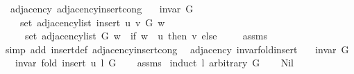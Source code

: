 \begin{isabellebody}
%
\isadelimproof
\isanewline
%
\endisadelimproof
\isanewline
{}\isamarkupfalse%
\ {\isacharparenleft}{\kern0pt}\ adjacency{\isacharparenright}{\kern0pt}\ adjacency{\isacharunderscore}{\kern0pt}insert{\isacharprime}{\kern0pt}{\isacharunderscore}{\kern0pt}cong{\isacharcolon}{\kern0pt}\isanewline
\ \ \ {\isachardoublequoteopen}invar\ G{\isachardoublequoteclose}\isanewline
\ \ \isanewline
\ \ \ \ {\isachardoublequoteopen}set\ {\isacharparenleft}{\kern0pt}adjacency{\isacharunderscore}{\kern0pt}list\ {\isacharparenleft}{\kern0pt}insert{\isacharprime}{\kern0pt}\ u\ v\ G{\isacharparenright}{\kern0pt}\ w{\isacharparenright}{\kern0pt}\ {\isacharequal}{\kern0pt}\isanewline
\ \ \ \ \ set\ {\isacharparenleft}{\kern0pt}adjacency{\isacharunderscore}{\kern0pt}list\ G\ w{\isacharparenright}{\kern0pt}\ {\isasymunion}\ {\isacharparenleft}{\kern0pt}if\ w\ {\isacharequal}{\kern0pt}\ u\ then\ {\isacharbraceleft}{\kern0pt}v{\isacharbraceright}{\kern0pt}\ else\ {\isacharbraceleft}{\kern0pt}{\isacharbraceright}{\kern0pt}{\isacharparenright}{\kern0pt}{\isachardoublequoteclose}\isanewline
%
\isadelimproof
\ \ %
\endisadelimproof
%
\isatagproof
{}\isamarkupfalse%
\ assms\isanewline
\ \ \isamarkupfalse%
\ {\isacharparenleft}{\kern0pt}simp\ add{\isacharcolon}{\kern0pt}\ insert{\isacharprime}{\kern0pt}{\isacharunderscore}{\kern0pt}def\ adjacency{\isacharunderscore}{\kern0pt}insert{\isacharunderscore}{\kern0pt}cong{\isacharparenright}{\kern0pt}%
\endisatagproof
{\isafoldproof}%
%
\isadelimproof
\isanewline
%
\endisadelimproof
\isanewline
{}\isamarkupfalse%
\ {\isacharparenleft}{\kern0pt}\ adjacency{\isacharparenright}{\kern0pt}\ invar{\isacharunderscore}{\kern0pt}fold{\isacharunderscore}{\kern0pt}insert{\isacharprime}{\kern0pt}{\isacharcolon}{\kern0pt}\isanewline
\ \ \ {\isachardoublequoteopen}invar\ G{\isachardoublequoteclose}\isanewline
\ \ \ {\isachardoublequoteopen}invar\ {\isacharparenleft}{\kern0pt}fold\ {\isacharparenleft}{\kern0pt}insert{\isacharprime}{\kern0pt}\ u{\isacharparenright}{\kern0pt}\ l\ G{\isacharparenright}{\kern0pt}{\isachardoublequoteclose}\isanewline
%
\isadelimproof
\ \ %
\endisadelimproof
%
\isatagproof
{}\isamarkupfalse%
\ assms\isanewline
{}\isamarkupfalse%
\ {\isacharparenleft}{\kern0pt}induct\ l\ arbitrary{\isacharcolon}{\kern0pt}\ G{\isacharparenright}{\kern0pt}\isanewline
\ \ \isamarkupfalse%
\ Nil\isanewline
\ \ \isamarkupfalse%

\end{isabellebody}
